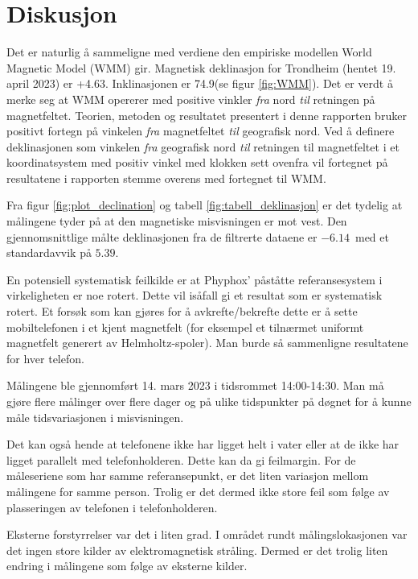 \section{Diskusjon}
Det er naturlig å sammeligne med verdiene den empiriske modellen World Magnetic Model (WMM) gir.
Magnetisk deklinasjon for Trondheim (hentet 19. april 2023) er +4.63\textdegree. Inklinasjonen er 74.9\textdegree (se figur \ref{fig:WMM}). 
\newline
Det er verdt å merke seg at WMM opererer med positive vinkler \textit{fra} nord \textit{til} retningen på magnetfeltet. 
Teorien, metoden og resultatet presentert i denne rapporten bruker positivt fortegn på vinkelen \textit{fra} magnetfeltet \textit{til} geografisk nord.
Ved å definere deklinasjonen som vinkelen \textit{fra} geografisk nord \textit{til} retningen til magnetfeltet i et koordinatsystem med positiv vinkel med klokken sett ovenfra vil fortegnet på resultatene i rapporten stemme overens med fortegnet til WMM.  
\par
Fra figur \ref{fig:plot_declination} og tabell \ref{fig:tabell_deklinasjon} er det tydelig at målingene tyder på at den magnetiske misvisningen er mot vest. Den gjennomsnittlige målte deklinasjonen fra de filtrerte dataene er $-6.14$\textdegree\ med et standardavvik på $5.39$\textdegree.
\par
En potensiell systematisk feilkilde er at Phyphox' påståtte referansesystem i virkeligheten er noe rotert. Dette vil isåfall gi et resultat som er systematisk rotert. 
Et forsøk som kan gjøres for å avkrefte/bekrefte dette er å sette mobiltelefonen i et kjent magnetfelt (for eksempel et tilnærmet uniformt magnetfelt generert av Helmholtz-spoler).
Man burde så sammenligne resultatene for hver telefon.
\par
Målingene ble gjennomført 14. mars 2023 i tidsrommet 14:00-14:30.
Man må gjøre flere målinger over flere dager og på ulike tidspunkter på døgnet for å kunne måle tidsvariasjonen i misvisningen. 
\par
Det kan også hende at telefonene ikke har ligget helt i vater eller at de ikke har ligget parallelt med telefonholderen. Dette kan da gi feilmargin. For de måleseriene som har samme referansepunkt, er det liten variasjon mellom målingene for samme person. Trolig er det dermed ikke store feil som følge av plasseringen av telefonen i telefonholderen. 

Eksterne forstyrrelser var det i liten grad. I området rundt målingslokasjonen var det ingen store kilder av elektromagnetisk stråling. Dermed er det trolig liten endring i målingene som følge av eksterne kilder. 

